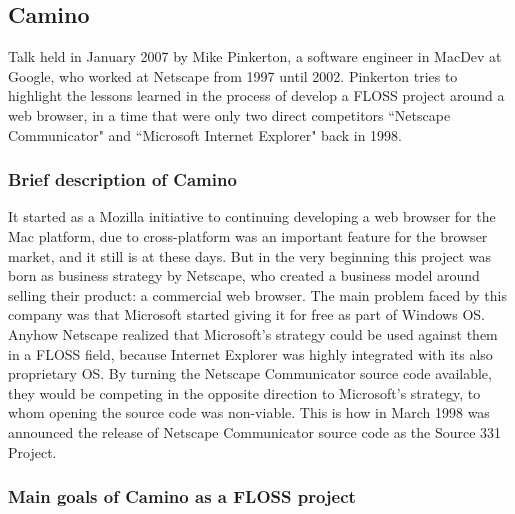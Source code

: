 \documentclass[11pt]{article} %
\begin{document}
\subsection{Camino}

Talk held in January 2007 by Mike Pinkerton, a software engineer in MacDev at Google, who worked at Netscape from 1997 until 2002. Pinkerton tries to highlight the lessons learned in the process of develop a FLOSS project around a web browser, in a time that were only two direct competitors ``Netscape Communicator" and ``Microsoft Internet Explorer" back in 1998.

\subsubsection{Brief description of Camino}

It started as a Mozilla initiative to continuing developing a web browser for the Mac platform, due to cross-platform was an important feature for the browser market, and it still is at these days. But in the very beginning this project was born as business strategy by Netscape, who created a business model around selling their product: a commercial web browser. The main problem faced by this company was that Microsoft started giving it for free as part of Windows OS. Anyhow Netscape realized that Microsoft's strategy could be used against them in a FLOSS field, because Internet Explorer was highly integrated with its also proprietary OS. By turning the Netscape Communicator source code available, they would be competing in the opposite direction to Microsoft's strategy, to whom opening the source code was non-viable. This is how in March 1998 was announced the release of Netscape Communicator source code as the Source 331 Project.

\subsubsection{Main goals of Camino as a FLOSS project}
\end{document}
